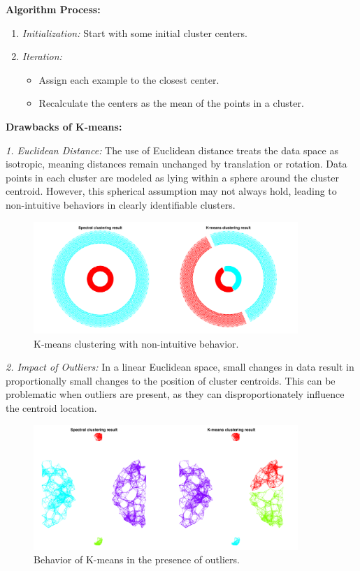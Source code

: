 \documentclass[unicode,11pt,a4paper,oneside,numbers=endperiod,openany]{scrartcl}
\begin{document}
\textbf{Algorithm Process:}
\begin{enumerate}
    \item \textit{Initialization:} Start with some initial cluster centers.
    \item \textit{Iteration:}
    \begin{itemize}
        \item Assign each example to the closest center.
        \item Recalculate the centers as the mean of the points in a cluster.
    \end{itemize}
\end{enumerate}

\textbf{Drawbacks of K-means:}

\textit{1. Euclidean Distance:}
The use of Euclidean distance treats the data space as isotropic, meaning distances remain unchanged by translation or rotation. Data points in each cluster are modeled as lying within a sphere around the cluster centroid. However, this spherical assumption may not always hold, leading to non-intuitive behaviors in clearly identifiable clusters.

\begin{figure}[H]
    \centering
    \includegraphics[trim=0cm 0cm 0cm 0cm, clip, width=10cm]{img3.png}
    \caption{K-means clustering with non-intuitive behavior.}
    \label{fig:img3}
\end{figure}

\textit{2. Impact of Outliers:}
In a linear Euclidean space, small changes in data result in proportionally small changes to the position of cluster centroids. This can be problematic when outliers are present, as they can disproportionately influence the centroid location.

\begin{figure}[H]
    \centering
    \includegraphics[trim=0cm 0cm 0cm 0cm, clip, width=10cm]{img4.png}
    \caption{Behavior of K-means in the presence of outliers.}
    \label{fig:img4}
\end{figure}
\end{document}
